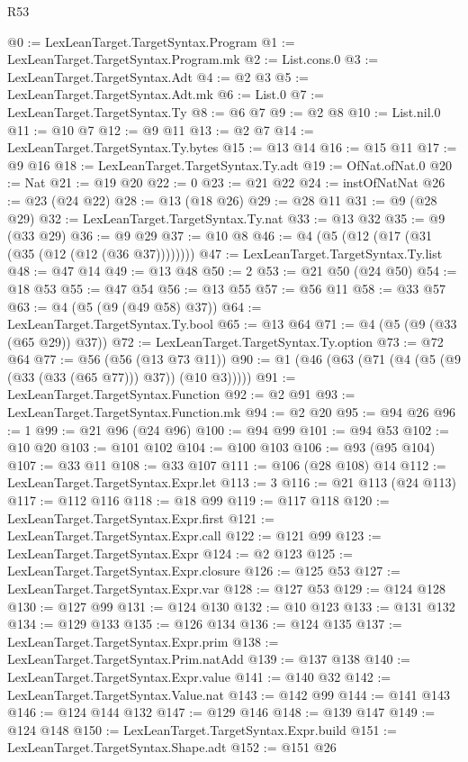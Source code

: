 \begin{lexlean}{R53}
\begin{coremodule}
@0 := LexLeanTarget.TargetSyntax.Program
@1 := LexLeanTarget.TargetSyntax.Program.mk
@2 := List.cons.{0}
@3 := LexLeanTarget.TargetSyntax.Adt
@4 := @2 @3
@5 := LexLeanTarget.TargetSyntax.Adt.mk
@6 := List.{0}
@7 := LexLeanTarget.TargetSyntax.Ty
@8 := @6 @7
@9 := @2 @8
@10 := List.nil.{0}
@11 := @10 @7
@12 := @9 @11
@13 := @2 @7
@14 := LexLeanTarget.TargetSyntax.Ty.bytes
@15 := @13 @14
@16 := @15 @11
@17 := @9 @16
@18 := LexLeanTarget.TargetSyntax.Ty.adt
@19 := OfNat.ofNat.{0}
@20 := Nat
@21 := @19 @20
@22 := 0
@23 := @21 @22
@24 := instOfNatNat
@26 := @23 (@24 @22)
@28 := @13 (@18 @26)
@29 := @28 @11
@31 := @9 (@28 @29)
@32 := LexLeanTarget.TargetSyntax.Ty.nat
@33 := @13 @32
@35 := @9 (@33 @29)
@36 := @9 @29
@37 := @10 @8
@46 := @4 (@5 (@12 (@17 (@31 (@35 (@12 (@12 (@36 @37))))))))
@47 := LexLeanTarget.TargetSyntax.Ty.list
@48 := @47 @14
@49 := @13 @48
@50 := 2
@53 := @21 @50 (@24 @50)
@54 := @18 @53
@55 := @47 @54
@56 := @13 @55
@57 := @56 @11
@58 := @33 @57
@63 := @4 (@5 (@9 (@49 @58) @37))
@64 := LexLeanTarget.TargetSyntax.Ty.bool
@65 := @13 @64
@71 := @4 (@5 (@9 (@33 (@65 @29)) @37))
@72 := LexLeanTarget.TargetSyntax.Ty.option
@73 := @72 @64
@77 := @56 (@56 (@13 @73 @11))
@90 := @1 (@46 (@63 (@71 (@4 (@5 (@9 (@33 (@33 (@65 @77))) @37)) (@10 @3)))))
@91 := LexLeanTarget.TargetSyntax.Function
@92 := @2 @91
@93 := LexLeanTarget.TargetSyntax.Function.mk
@94 := @2 @20
@95 := @94 @26
@96 := 1
@99 := @21 @96 (@24 @96)
@100 := @94 @99
@101 := @94 @53
@102 := @10 @20
@103 := @101 @102
@104 := @100 @103
@106 := @93 (@95 @104)
@107 := @33 @11
@108 := @33 @107
@111 := @106 (@28 @108) @14
@112 := LexLeanTarget.TargetSyntax.Expr.let
@113 := 3
@116 := @21 @113 (@24 @113)
@117 := @112 @116
@118 := @18 @99
@119 := @117 @118
@120 := LexLeanTarget.TargetSyntax.Expr.first
@121 := LexLeanTarget.TargetSyntax.Expr.call
@122 := @121 @99
@123 := LexLeanTarget.TargetSyntax.Expr
@124 := @2 @123
@125 := LexLeanTarget.TargetSyntax.Expr.closure
@126 := @125 @53
@127 := LexLeanTarget.TargetSyntax.Expr.var
@128 := @127 @53
@129 := @124 @128
@130 := @127 @99
@131 := @124 @130
@132 := @10 @123
@133 := @131 @132
@134 := @129 @133
@135 := @126 @134
@136 := @124 @135
@137 := LexLeanTarget.TargetSyntax.Expr.prim
@138 := LexLeanTarget.TargetSyntax.Prim.natAdd
@139 := @137 @138
@140 := LexLeanTarget.TargetSyntax.Expr.value
@141 := @140 @32
@142 := LexLeanTarget.TargetSyntax.Value.nat
@143 := @142 @99
@144 := @141 @143
@146 := @124 @144 @132
@147 := @129 @146
@148 := @139 @147
@149 := @124 @148
@150 := LexLeanTarget.TargetSyntax.Expr.build
@151 := LexLeanTarget.TargetSyntax.Shape.adt
@152 := @151 @26

\end{coremodule}
\end{lexlean}
